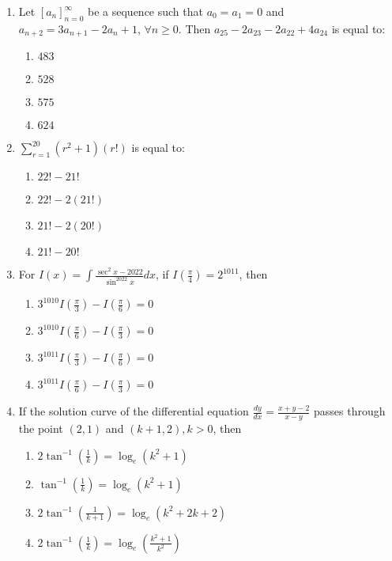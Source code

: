 \documentclass[journal]{IEEEtran}
\newcommand{\brak}[1]{\left( #1 \right)}
\newcommand{\sbrak}[1]{\left[ #1 \right]}
\newcommand{\gt}{>}
\begin{document}
\begin{enumerate}
    \item Let $\sbrak{a_{n}}_{n=0}^{\infty}$ be a sequence such that $a_{0}=a_{1}=0$ and $a_{n+2}=3a_{n+1}-2a_{n}+1$, $\forall n\geq0$. Then $a_{25}-2a_{23}-2a_{22}+4a_{24}$ is equal to:

        \begin{multicols}{4}
        \begin{enumerate}
        \item $483$
        \item $528$
        \item $575$
        \item $624$
        \end{enumerate}
        \end{multicols}

    \item $\sum_{r=1}^{20}\brak{r^{2}+1}\brak{r!}$ is equal to:

        \begin{multicols}{4}
        \begin{enumerate}
        \item $22!-21!$
        \item $22!-2\brak{21!}$
        \item $21!-2\brak{20!}$
        \item $21!-20!$
        \end{enumerate}
        \end{multicols}

    \item For $I\brak{x}=\int\frac{\sec^{2}x-2022}{\sin^{2022}x}dx$, if $I\brak{\frac{\pi}{4}}=2^{1011}$, then

        \begin{enumerate}
        \item $3^{1010}I\brak{\frac{\pi}{3}}-I\brak{\frac{\pi}{6}}=0$
        \item $3^{1010}I\brak{\frac{\pi}{6}}-I\brak{\frac{\pi}{3}}=0$
        \item $3^{1011}I\brak{\frac{\pi}{3}}-I\brak{\frac{\pi}{6}}=0$
        \item $3^{1011}I\brak{\frac{\pi}{6}}-I\brak{\frac{\pi}{3}}=0$
        \end{enumerate}
      
    \item If the solution curve of the differential equation $\frac{dy}{dx}=\frac{x+y-2}{x-y}$ passes through the point $\brak{2,1}$ and $\brak{k+1,2},k\gt0$, then

        \begin{enumerate}
        \item $2\tan^{-1}\brak{\frac{1}{k}}=\log_{e}\brak{k^{2}+1}$
        \item $\tan^{-1}\brak{\frac{1}{k}}=\log_{e}\brak{k^{2}+1}$
        \item $2\tan^{-1}\brak{\frac{1}{k+1}}=\log_{e}\brak{k^{2}+2k+2}$
        \item $2\tan^{-1}\brak{\frac{1}{k}}=\log_{e}\brak{\frac{k^{2}+1}{k^{2}}}$
        \end{enumerate}


\end{enumerate}
\end{document}

